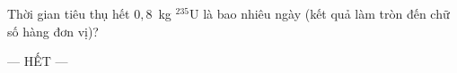 	\begin{ex}%
		\label{NinhBinh-Cum9-Lan1-III6}
		Thời gian tiêu thụ hết $0{,}8$~kg ${}^{235}\text{U}$ là bao nhiêu ngày (kết quả làm tròn đến chữ số hàng đơn vị)?
		\par
	\end{ex}

	\centerline{--- HẾT ---}


